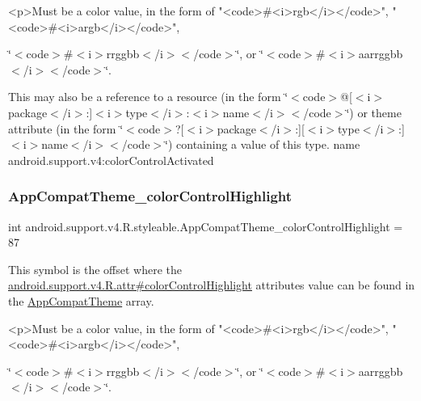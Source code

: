 \begin{DoxyVerb}      <p>Must be a color value, in the form of "<code>#<i>rgb</i></code>", "<code>#<i>argb</i></code>",
\end{DoxyVerb}
 \char`\"{}$<$code$>$\#$<$i$>$rrggbb$<$/i$>$$<$/code$>$\char`\"{}, or \char`\"{}$<$code$>$\#$<$i$>$aarrggbb$<$/i$>$$<$/code$>$\char`\"{}. 

This may also be a reference to a resource (in the form \char`\"{}$<$code$>$@\mbox{[}$<$i$>$package$<$/i$>$\+:\mbox{]}$<$i$>$type$<$/i$>$\+:$<$i$>$name$<$/i$>$$<$/code$>$\char`\"{}) or theme attribute (in the form \char`\"{}$<$code$>$?\mbox{[}$<$i$>$package$<$/i$>$\+:\mbox{]}\mbox{[}$<$i$>$type$<$/i$>$\+:\mbox{]}$<$i$>$name$<$/i$>$$<$/code$>$\char`\"{}) containing a value of this type.  name android.\+support.\+v4\+:color\+Control\+Activated \mbox{\label{classandroid_1_1support_1_1v4_1_1R_1_1styleable_afc6290158c8ec3418e088f79325e48cd}} 
\subsubsection{\texorpdfstring{App\+Compat\+Theme\+\_\+color\+Control\+Highlight}{AppCompatTheme\_colorControlHighlight}}
{\footnotesize\ttfamily int android.\+support.\+v4.\+R.\+styleable.\+App\+Compat\+Theme\+\_\+color\+Control\+Highlight = 87\hspace{0.3cm}{\ttfamily [static]}}

This symbol is the offset where the \hyperlink{classandroid_1_1support_1_1v4_1_1R_1_1attr_ad8a8cfc0cf93dff590afe93fe48695cb}{android.\+support.\+v4.\+R.\+attr\#color\+Control\+Highlight} attribute\textquotesingle{}s value can be found in the \hyperlink{classandroid_1_1support_1_1v4_1_1R_1_1styleable_ac07ebbe62ed977f6dcaadc6397840ace}{App\+Compat\+Theme} array.

\begin{DoxyVerb}      <p>Must be a color value, in the form of "<code>#<i>rgb</i></code>", "<code>#<i>argb</i></code>",
\end{DoxyVerb}
 \char`\"{}$<$code$>$\#$<$i$>$rrggbb$<$/i$>$$<$/code$>$\char`\"{}, or \char`\"{}$<$code$>$\#$<$i$>$aarrggbb$<$/i$>$$<$/code$>$\char`\"{}. 

